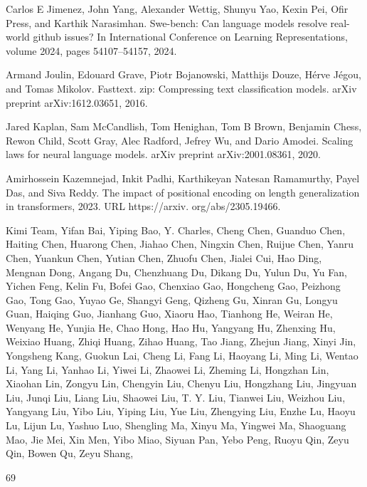 \documentclass[
  10
]{article}
\begin{document}
Carlos E Jimenez, John Yang, Alexander Wettig, Shunyu Yao, Kexin Pei,
Ofir Press, and Karthik Narasimhan. Swe-bench: Can language models
resolve real-world github issues? In International Conference on
Learning Representations, volume 2024, pages 54107--54157, 2024.

Armand Joulin, Edouard Grave, Piotr Bojanowski, Matthijs Douze, Hérve
Jégou, and Tomas Mikolov. Fasttext. zip: Compressing text classification
models. arXiv preprint arXiv:1612.03651, 2016.

Jared Kaplan, Sam McCandlish, Tom Henighan, Tom B Brown, Benjamin Chess,
Rewon Child, Scott Gray, Alec Radford, Jefrey Wu, and Dario Amodei.
Scaling laws for neural language models. arXiv preprint
arXiv:2001.08361, 2020.

Amirhossein Kazemnejad, Inkit Padhi, Karthikeyan Natesan Ramamurthy,
Payel Das, and Siva Reddy. The impact of positional encoding on length
generalization in transformers, 2023. URL https://arxiv.
org/abs/2305.19466.

Kimi Team, Yifan Bai, Yiping Bao, Y. Charles, Cheng Chen, Guanduo Chen,
Haiting Chen, Huarong Chen, Jiahao Chen, Ningxin Chen, Ruijue Chen,
Yanru Chen, Yuankun Chen, Yutian Chen, Zhuofu Chen, Jialei Cui, Hao
Ding, Mengnan Dong, Angang Du, Chenzhuang Du, Dikang Du, Yulun Du, Yu
Fan, Yichen Feng, Kelin Fu, Bofei Gao, Chenxiao Gao, Hongcheng Gao,
Peizhong Gao, Tong Gao, Yuyao Ge, Shangyi Geng, Qizheng Gu, Xinran Gu,
Longyu Guan, Haiqing Guo, Jianhang Guo, Xiaoru Hao, Tianhong He, Weiran
He, Wenyang He, Yunjia He, Chao Hong, Hao Hu, Yangyang Hu, Zhenxing Hu,
Weixiao Huang, Zhiqi Huang, Zihao Huang, Tao Jiang, Zhejun Jiang, Xinyi
Jin, Yongsheng Kang, Guokun Lai, Cheng Li, Fang Li, Haoyang Li, Ming Li,
Wentao Li, Yang Li, Yanhao Li, Yiwei Li, Zhaowei Li, Zheming Li,
Hongzhan Lin, Xiaohan Lin, Zongyu Lin, Chengyin Liu, Chenyu Liu,
Hongzhang Liu, Jingyuan Liu, Junqi Liu, Liang Liu, Shaowei Liu, T. Y.
Liu, Tianwei Liu, Weizhou Liu, Yangyang Liu, Yibo Liu, Yiping Liu, Yue
Liu, Zhengying Liu, Enzhe Lu, Haoyu Lu, Lijun Lu, Yashuo Luo, Shengling
Ma, Xinyu Ma, Yingwei Ma, Shaoguang Mao, Jie Mei, Xin Men, Yibo Miao,
Siyuan Pan, Yebo Peng, Ruoyu Qin, Zeyu Qin, Bowen Qu, Zeyu Shang,

69
\end{document}
